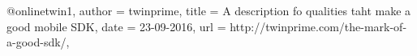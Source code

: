 @online{twin1,
	author = {twinprime},
	title = {A description fo qualities taht make a good mobile SDK},
	date = {23-09-2016},
	url = {http://twinprime.com/the-mark-of-a-good-sdk/},
}
